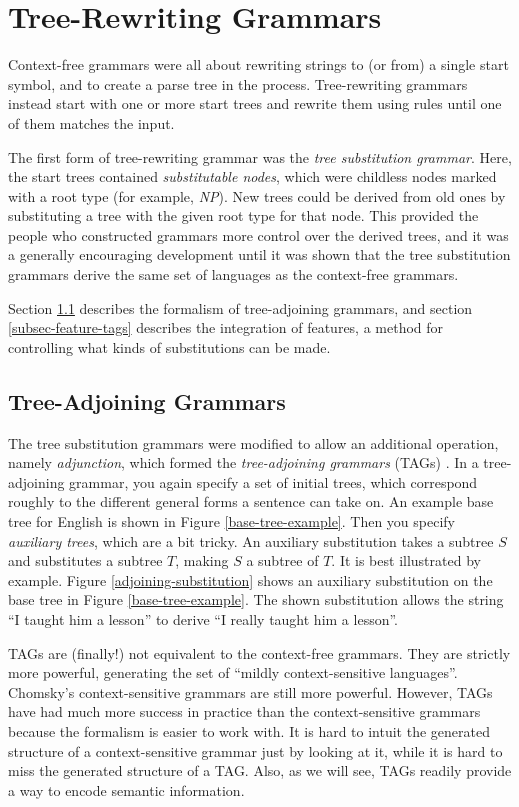 \documentclass[12pt]{article}
\newcommand{\defn}[1]{\textit{#1}}
\begin{document}
\section{Tree-Rewriting Grammars}

Context-free grammars were all about rewriting strings to (or from) a
single start symbol, and to create a parse tree in the process.
Tree-rewriting grammars instead start with one or more start trees and
rewrite them using rules until one of them matches the input. 

The first form of tree-rewriting grammar was the \defn{tree substitution
grammar}.  Here, the start trees contained \defn{substitutable nodes},
which were childless nodes marked with a root type (for example,
\textit{NP}).  New trees could be derived from old ones by substituting
a tree with the given root type for that node.  This provided the people
who constructed grammars more control over the derived trees, and it was
a generally encouraging development until it was shown that the tree
substitution grammars derive the same set of languages as the
context-free grammars.

Section \ref{subsec-tags} describes the formalism of tree-adjoining
grammars, and section \ref{subsec-feature-tags} describes the
integration of features, a method for controlling what kinds of
substitutions can be made.

\subsection{Tree-Adjoining Grammars}
\label{subsec-tags}

The tree substitution grammars were modified to allow an additional
operation, namely \defn{adjunction}, which formed the
\defn{tree-adjoining grammars} (TAGs) \cite{Joshi-1975}.  In a tree-adjoining grammar, you
again specify a set of initial trees, which correspond roughly to the
different general forms a sentence can take on.  An example base tree
for English is shown in Figure \ref{base-tree-example}.  Then you
specify \defn{auxiliary trees}, which are a bit tricky.  An auxiliary
substitution takes a subtree $S$ and substitutes a subtree $T$, making
$S$ a subtree of $T$.  It is best illustrated by example.  Figure
\ref{adjoining-substitution} shows an auxiliary substitution on the base
tree in Figure \ref{base-tree-example}.  The shown substitution allows
the string ``I taught him a lesson'' to derive ``I really taught him a
lesson''.

TAGs are (finally!) not equivalent to the context-free grammars.  They
are strictly more powerful, generating the set of ``mildly
context-sensitive languages''.  Chomsky's context-sensitive grammars are
still more powerful.  However, TAGs have had much more success in
practice than the context-sensitive grammars because the formalism is
easier to work with.  It is hard to intuit the generated structure of a
context-sensitive grammar just by looking at it, while it is hard to
miss the generated structure of a TAG.  Also, as we will see, TAGs
readily provide a way to encode semantic information.
\end{document}
